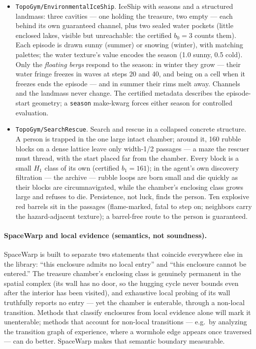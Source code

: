 \documentclass[11pt]{article}
\newcommand{\Hm}[1]{H_{#1}}
\begin{document}
\begin{itemize}[leftmargin=2em, itemsep=3pt]
        proximity (a slot lights up when any clown is within one
        cell); the clowns are otherwise sensed only through the
        reward gradient --- which is exactly the signal that must be
        distrusted.
  \item \texttt{TopoGym/EnvironmentalIceShip}. IceShip with seasons
        and a structured landmass: three cavities --- one holding the
        treasure, two empty --- each behind its own guaranteed
        channel, plus two sealed water pockets (little enclosed
        lakes, visible but unreachable: the certified $b_0 = 3$
        counts them). Each episode is drawn sunny (summer) or snowing
        (winter), with matching palettes; the water texture's value
        encodes the season (1.0 sunny, 0.5 cold). Only the
        \emph{floating bergs} respond to the season: in winter they
        grow --- their water fringe freezes in waves at steps 20 and
        40, and being on a cell when it freezes ends the episode ---
        and in summer their rims melt away. Channels and the landmass
        never change. The certified metadata describes the
        episode-start geometry; a \texttt{season} make-kwarg forces
        either season for controlled evaluation.
  \item \texttt{TopoGym/SearchRescue}. Search and rescue in a
        collapsed concrete structure. A person is trapped in the one
        large intact chamber; around it, 160 rubble blocks on a dense
        lattice leave only width-1/2 passages --- a maze the rescuer
        must thread, with the start placed far from the chamber. Every
        block is a small $\Hm{1}$ class of its own (certified
        $b_1 = 161$); in the agent's own discovery filtration --- the
        archive --- rubble loops are born small and die quickly as
        their blocks are circumnavigated, while the chamber's
        enclosing class grows large and refuses to die. Persistence,
        not luck, finds the person. Ten explosive red barrels sit in
        the passages (flame-marked, fatal to step on; neighbors carry
        the hazard-adjacent texture); a barrel-free route to the
        person is guaranteed.
\end{itemize}

\paragraph{SpaceWarp and local evidence (semantics, not
soundness).} SpaceWarp is built to separate two statements that
coincide everywhere else in the library: ``this enclosure admits no
local entry'' and ``this enclosure cannot be entered.'' The treasure
chamber's enclosing class is genuinely permanent in the spatial
complex (its wall has no door, so the hugging cycle never bounds even
after the interior has been visited), and exhaustive local probing of
its wall truthfully reports no entry --- yet the chamber is
enterable, through a non-local transition. Methods that classify
enclosures from local evidence alone will mark it unenterable;
methods that account for non-local transitions --- e.g.\ by analyzing
the transition graph of experience, where a wormhole edge appears
once traversed --- can do better. SpaceWarp makes that semantic
boundary measurable.
\end{document}
